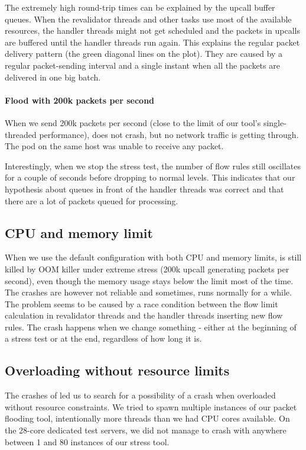The extremely high round-trip times can be explained by the upcall buffer queues. When the revalidator threads and other tasks use most of the available resources, the handler threads might not get scheduled and the packets in upcalls are buffered until the handler threads run again. This explains the regular packet delivery pattern (the green diagonal lines on the plot). They are caused by a regular packet-sending interval and a single instant when all the packets are delivered in one big batch.

\paragraph{Flood with 200k packets per second}
When we send 200k packets per second (close to the limit of our tool's single-threaded performance),  does not crash, but no network traffic is getting through. The  pod on the same host was unable to receive any packet.

Interestingly, when we stop the stress test, the number of flow rules still oscillates for a couple of seconds before dropping to normal levels. This indicates that our hypothesis about queues in front of the handler threads was correct and that there are a lot of packets queued for processing. 

\subsection{CPU and memory limit}

When we use the default configuration with both CPU and memory limits,  is still killed by OOM killer under extreme stress (200k upcall generating packets per second), even though the memory usage stays below the limit most of the time. The crashes are however not reliable and sometimes,  runs normally for a while. The problem seems to be caused by a race condition between the flow limit calculation in revalidator threads and the handler threads inserting new flow rules. The crash happens when we change something - either at the beginning of a stress test or at the end, regardless of how long it is.

\subsection{Overloading  without resource limits}

The crashes of  led us to search for a possibility of a crash when overloaded without resource constraints. We tried to spawn multiple instances of our packet flooding tool, intentionally more threads than we had CPU cores available. On the 28-core dedicated test servers, we did not manage to crash  with anywhere between 1 and 80 instances of our stress tool.

